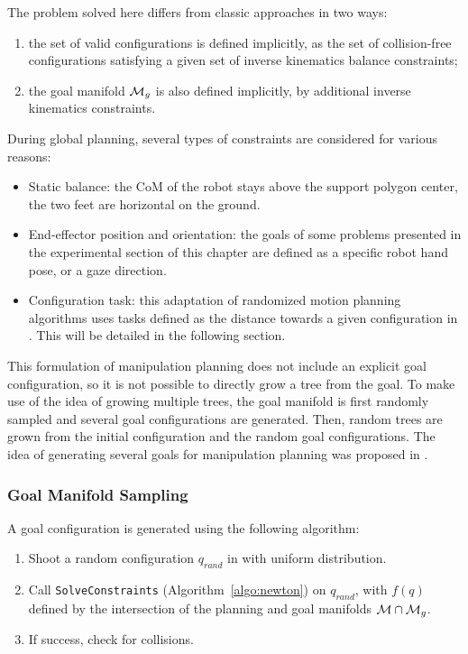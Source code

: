 The problem solved here differs from classic approaches in two ways:
\begin{enumerate}
\item the set of valid configurations is defined implicitly, as the
  set of collision-free configurations satisfying a given set of
  inverse kinematics balance constraints;
\item the goal manifold $\mathcal{M}_{g}$ is also defined implicitly,
  by additional inverse kinematics constraints.
\end{enumerate}
During global planning, several types of constraints are considered
for various reasons:
\begin{itemize}
\item Static balance: the CoM of the robot stays above the support
  polygon center, the two feet are horizontal on the ground.
\item End-effector position and orientation: the goals of some
  problems presented in the experimental section of this chapter are
  defined as a specific robot hand pose, or a gaze direction.
\item Configuration task: this adaptation of randomized motion
  planning algorithms uses tasks defined as the distance towards a
  given configuration in \cspace. This will be detailed in the
  following section.
\end{itemize}

This formulation of manipulation planning does not include an explicit
goal configuration, so it is not possible to directly grow a tree from
the goal. To make use of the idea of growing multiple trees, the goal
manifold is first randomly sampled and several goal configurations are
generated. Then, random trees are grown from the initial configuration
and the random goal configurations. The idea of generating several
goals for manipulation planning was proposed in \cite{diankov2008bpc}.

\subsubsection{Goal Manifold Sampling}
\label{subsubsec:chap2-goal-sampling}

A goal configuration is generated using the following algorithm:
\begin{enumerate}
\item Shoot a random configuration $q_{rand}$ in \cspace with
  uniform distribution.
\item Call \texttt{SolveConstraints} (Algorithm~\ref{algo:newton}) on
  $q_{rand}$, with $f(q)$ defined by the intersection of the planning
  and goal manifolds $\mathcal{M} \cap \mathcal{M}_{g}$.
\item If success, check for collisions.
\end{enumerate}


